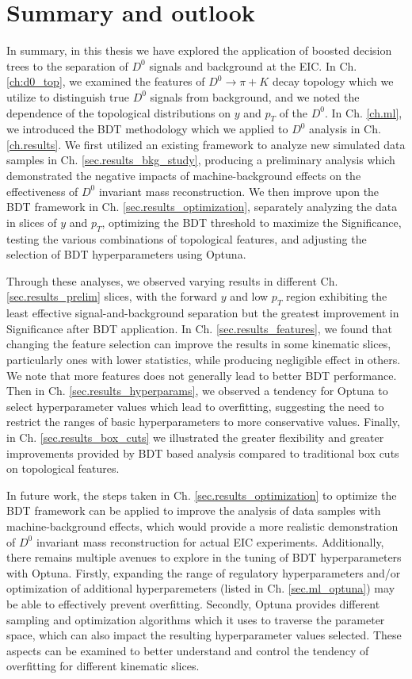 \chapter{Summary and outlook}
\label{conclusion}

In summary, in this thesis we have explored the application of boosted decision trees to the separation of $D^0$ signals and background at the EIC. In Ch. \ref{ch:d0_top}, we examined the features of $D^0\rightarrow\pi+K$ decay topology which we utilize to distinguish true $D^0$ signals from background, and we noted the dependence of the topological distributions on $y$ and $p_T$ of the $D^0$. In Ch. \ref{ch.ml}, we introduced the BDT methodology which we applied to $D^0$ analysis in Ch. \ref{ch.results}. We first utilized an existing framework \cite{Shyam_ml} to analyze new simulated data samples in Ch. \ref{sec.results_bkg_study}, producing a preliminary analysis which demonstrated the negative impacts of machine-background effects on the effectiveness of $D^0$ invariant mass reconstruction. We then improve upon the BDT framework in Ch. \ref{sec.results_optimization}, separately analyzing the data in slices of $y$ and $p_T$, optimizing the BDT threshold to maximize the Significance, testing the various combinations of topological features, and adjusting the selection of BDT hyperparameters using Optuna. 

Through these analyses, we observed varying results in different Ch. \ref{sec.results_prelim} slices, with the forward $y$ and low $p_T$ region exhibiting the least effective signal-and-background separation but the greatest improvement in Significance after BDT application. In Ch. \ref{sec.results_features}, we found that changing the feature selection can improve the results in some kinematic slices, particularly ones with lower statistics, while producing negligible effect in others. We note that more features does not generally lead to better BDT performance. Then in Ch. \ref{sec.results_hyperparams}, we observed a tendency for Optuna to select hyperparameter values which lead to overfitting, suggesting the need to restrict the ranges of basic hyperparameters to more conservative values. Finally, in Ch. \ref{sec.results_box_cuts} we illustrated the greater flexibility and greater improvements provided by BDT based analysis compared to traditional box cuts on topological features.

In future work, the steps taken in Ch. \ref{sec.results_optimization} to optimize the BDT framework can be applied to improve the analysis of data samples with machine-background effects, which would provide a more realistic demonstration of $D^0$ invariant mass reconstruction for actual EIC experiments. Additionally, there remains multiple avenues to explore in the tuning of BDT hyperparameters with Optuna. Firstly, expanding the range of regulatory hyperparameters and/or optimization of additional hyperparemeters (listed in Ch. \ref{sec.ml_optuna}) may be able to effectively prevent overfitting. Secondly, Optuna provides different sampling and optimization algorithms \cite{Optuna_docs} which it uses to traverse the parameter space, which can also impact the resulting hyperparameter values selected. These aspects can be examined to better understand and control the tendency of overfitting for different kinematic slices.
